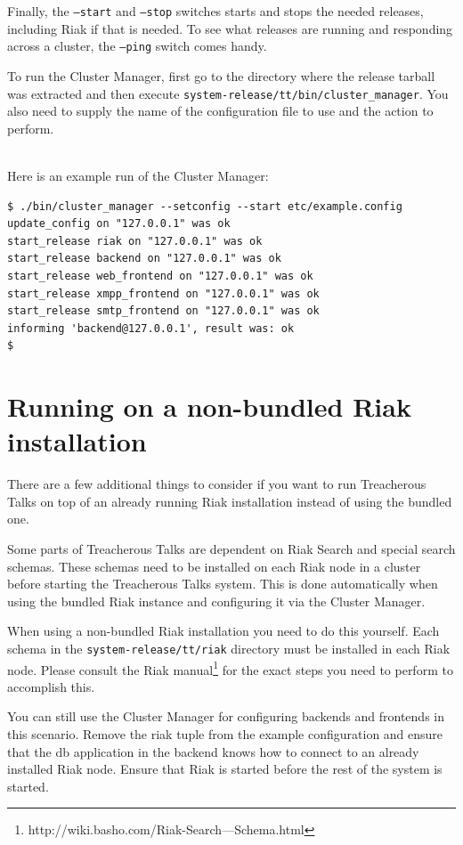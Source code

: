 \documentclass[11pt,a4paper]{report}
\begin{document}
Finally, the {\tt --start} and {\tt --stop} switches starts and stops the needed
releases, including Riak if that is needed. To see what releases are running and
responding across a cluster, the {\tt--ping} switch comes handy.

\begin{sloppypar}
To run the Cluster Manager, first go to the directory where the release tarball
was extracted and then execute {\tt system-release/tt/bin/cluster\_manager}. You
also need to supply the name of the configuration file to use and the action to
perform.
\end{sloppypar}
\mbox{}\\
Here is an example run of the Cluster Manager:
\begin{verbatim}
$ ./bin/cluster_manager --setconfig --start etc/example.config
update_config on "127.0.0.1" was ok
start_release riak on "127.0.0.1" was ok
start_release backend on "127.0.0.1" was ok
start_release web_frontend on "127.0.0.1" was ok
start_release xmpp_frontend on "127.0.0.1" was ok
start_release smtp_frontend on "127.0.0.1" was ok
informing 'backend@127.0.0.1', result was: ok
$
\end{verbatim}
\section{Running on a non-bundled Riak installation}
There are a few additional things to consider if you want to run Treacherous
Talks on top of an already running Riak installation instead of using the
bundled one.

Some parts of Treacherous Talks are dependent on Riak Search and special search
schemas. These schemas need to be installed on each Riak node in a cluster
before starting the Treacherous Talks system. This is done automatically when
using the bundled Riak instance and configuring it via the Cluster Manager.

When using a non-bundled Riak installation you need to do this yourself. Each
schema in the {\tt system-release/tt/riak} directory must be installed in each
Riak node. Please consult the Riak manual\footnote{http://wiki.basho.com/Riak-Search---Schema.html}
for the exact steps you need to perform to accomplish this.

You can still use the Cluster Manager for configuring backends and frontends in
this scenario. Remove the riak tuple from the example configuration and ensure
that the db application in the backend knows how to connect to an already
installed Riak node. Ensure that Riak is started before the rest of the system
is started.
\end{document}
